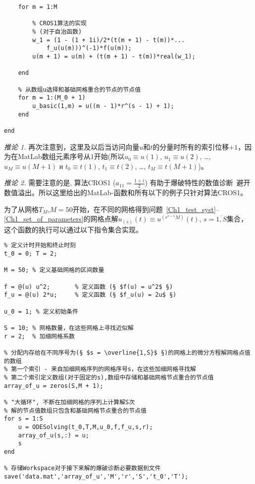 \documentclass[twoside]{book}
\begin{document}
\begin{CJK*}{GBK}{song}
\begin{lstlisting}
    for m = 1:M

        % CROS1算法的实现
        % (对于自治函数)
        w_1 = (1 - (1 + 1i)/2*(t(m + 1) - t(m))*...
            f_u(u(m)))^(-1)*f(u(m));
        u(m + 1) = u(m) + (t(m + 1) - t(m))*real(w_1);

    end

    % 从数组u选择和基础网格重合的节点的节点值
    for m = 1:(M_0 + 1)
        u_basic(1,m) = u((m - 1)*r^(s - 1) + 1);
    end

end
\end{lstlisting}


\emph{推论 1.} 再次注意到，这里及以后当访问向量$u$和$t$的分量时所有的索引位移$+1$，因为在MatLab数组元素序号从$1$开始(所以$u_0 \equiv u(1)$, $u_1 \equiv u(2)$, \ldots, $u_M \equiv u(M + 1)$ и $t_0 \equiv t(1)$, $t_1 \equiv t(2)$, \ldots, $t_M \equiv t(M + 1)$)。

\emph{推论 2.} \label{rem02} 需要注意的是, 算法CROS1 ($a_{11} = \frac{1 + i}{2}$) 有助于爆破特性的数值诊断~\cite{BUE_basic_1,BUE_basic_2}避开数值溢出。所以这里给出的MatLab-函数和所有以下的例子只针对算法CROS1。

\newpage
为了从网格$T_M$,$M = 50$开始，在不同的网格得到问题~\eqref{Ch1_test_syst}--\eqref{Ch1_set_of_parameters}的网格点解$u_{(s)}(t) \equiv u^{(r^{s - 1}M)}(t)$, $s = \overline{1,S}$集合，这个函数的执行可以通过以下指令集合实现。
%
\begin{lstlisting}
% 定义计时开始和终止时刻
t_0 = 0; T = 2;

M = 50; % 定义基础网格的区间数量

f = @(u) u^2;       % 定义函数 (§ $f(u) = u^2$ §)
f_u = @(u) 2*u;     % 定义函数 (§ $f_u(u) = 2u$ §)

u_0 = 1; % 定义初始条件

S = 10; % 网格数量，在这些网格上寻找近似解
r = 2;  % 加细网格系数

% 分配内存给在不同序号为(§ $s = \overline{1,S}$ §)的网格上的微分方程解网格点值的数组
% 第一个索引 - 来自加细网格序列的网格序号s，在这些加细网格寻找解
% 第二个索引定义数组(对于固定的s),数组中存储和基础网格节点重合的节点值
array_of_u = zeros(S,M + 1);

% "大循环", 不断在加细网格的序列上计算解S次
% 解的节点值数组只包含和基础网格节点重合的节点值
for s = 1:S
    u = ODESolving(t_0,T,M,u_0,f,f_u,s,r);
    array_of_u(s,:) = u;
    s
end

% 存储Workspace对于接下来解的爆破诊断必要数据到文件
save('data.mat','array_of_u','M','r','S','t_0','T');
\end{lstlisting}




\end{CJK*}
\end{document}
